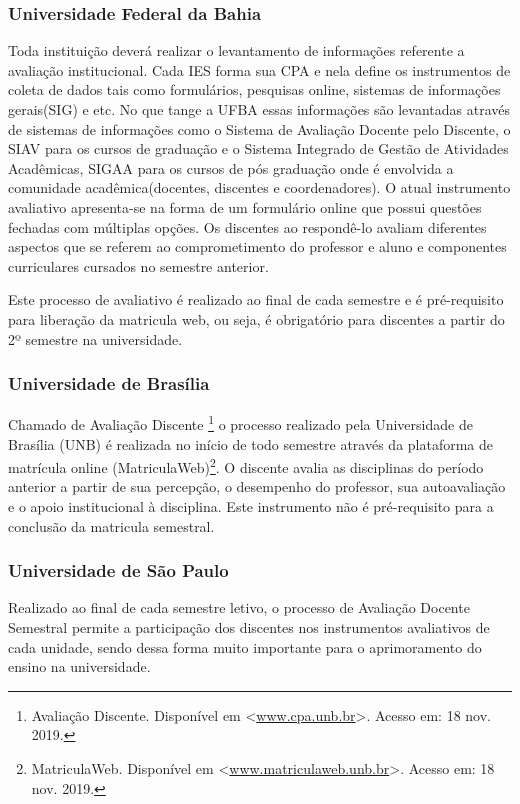 \documentclass[12pt, a4paper]{report}
\begin{document}
 \subsubsection{Universidade Federal da Bahia}
 Toda instituição deverá realizar o levantamento de informações referente a avaliação institucional. Cada \ac{IES} forma sua \ac{CPA} e nela define os instrumentos de coleta de dados tais como formulários, pesquisas online, sistemas de informações gerais(SIG) e etc. No que tange a UFBA essas informações são levantadas através de sistemas de informações como o Sistema de Avaliação Docente pelo Discente, o \ac{SIAV} para os cursos de graduação e o Sistema Integrado de Gestão de Atividades Acadêmicas, \ac{SIGAA} para os cursos de pós graduação onde é envolvida a comunidade acadêmica(docentes, discentes e coordenadores).
 O atual instrumento avaliativo apresenta-se na forma de um formulário online que possui questões fechadas com múltiplas opções. Os discentes ao respondê-lo avaliam diferentes aspectos que se referem ao comprometimento do professor e aluno e componentes curriculares cursados no semestre anterior.
 
 Este processo de avaliativo é realizado ao final de cada semestre e é pré-requisito para liberação da matricula web, ou seja, é obrigatório para discentes a partir do 2º semestre na universidade.
 
\subsubsection{Universidade de Brasília}
Chamado de Avaliação Discente \footnote{Avaliação Discente. Disponível em <\url{www.cpa.unb.br}>. Acesso em: 18 nov. 2019.} o processo realizado pela Universidade de Brasília (UNB) é realizada no início de todo semestre através da plataforma de matrícula online (MatriculaWeb)\footnote{MatriculaWeb. Disponível em <\url{www.matriculaweb.unb.br}>. Acesso em: 18 nov. 2019.}. O discente avalia as disciplinas do período anterior a partir de sua percepção, o desempenho do professor, sua autoavaliação e o apoio institucional à disciplina. Este instrumento não é pré-requisito para a conclusão da matricula semestral.
 
\subsubsection{Universidade de São Paulo}

Realizado ao final de cada semestre letivo, o processo de Avaliação Docente Semestral permite a participação dos discentes nos instrumentos avaliativos de cada unidade, sendo dessa forma muito importante para o aprimoramento do ensino na universidade.
\end{document}
